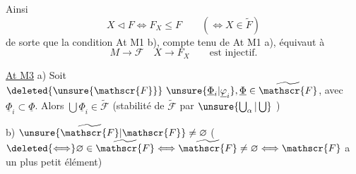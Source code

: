 Ainsi 
\[
X\triangleleft F\Longleftrightarrow F_X\leq F\qquad(\Longleftrightarrow X\in\widetilde{F})
\]
de sorte que la condition At M1 b), compte tenu de At M1 a), équivaut à
\[
M\longrightarrow\mathscr{F}\quad X\longrightarrow F_X\qquad\text{est injectif}.
\]

\uline{At M3} a) Soit $\deleted{\unsure{\mathscr{F}}}\ \unsure{\underline{\Phi}_i|\underline{\varphi}_i},\underline{\Phi}\in\widetilde{\mathscr{F}}$, avec $\underline{\Phi}_i\subset\underline{\Phi}$. Alors $\bigcup\underline{\Phi}_i\in\widetilde{\mathscr{F}}$ (stabilité de $\widetilde{\mathscr{F}}$ par $\unsure{\bigcup_{\alpha}|\bigcup}$ )

b) $\unsure{\widetilde{\mathscr{F}}|\mathscr{F}}\neq\varnothing$ ($\deleted{\Longleftrightarrow}\varnothing\in\widetilde{\mathscr{F}}\Longleftrightarrow\widetilde{\mathscr{F}}\neq\varnothing\Longleftrightarrow\mathscr{F}$ a un plus petit élément)
